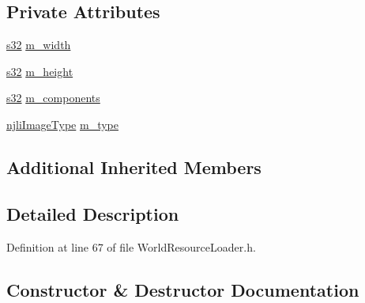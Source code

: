 \subsection*{Private Attributes}
\begin{DoxyCompactItemize}
\item 
\mbox{\hyperlink{_util_8h_aa62c75d314a0d1f37f79c4b73b2292e2}{s32}} \mbox{\hyperlink{structnjli_1_1_world_resource_loader_1_1_image_file_data_a815ccf3f42b60a7beead9461aab34639}{m\+\_\+width}}
\item 
\mbox{\hyperlink{_util_8h_aa62c75d314a0d1f37f79c4b73b2292e2}{s32}} \mbox{\hyperlink{structnjli_1_1_world_resource_loader_1_1_image_file_data_a1d7c73d35c27494186c9b111dcdc00f5}{m\+\_\+height}}
\item 
\mbox{\hyperlink{_util_8h_aa62c75d314a0d1f37f79c4b73b2292e2}{s32}} \mbox{\hyperlink{structnjli_1_1_world_resource_loader_1_1_image_file_data_afc583e7a8ffdb4522dad5ae4d96d486d}{m\+\_\+components}}
\item 
\mbox{\hyperlink{namespacenjli_a709a24b63b768ce1cdff54f7f48d3c0b}{njli\+Image\+Type}} \mbox{\hyperlink{structnjli_1_1_world_resource_loader_1_1_image_file_data_a50337476c93a38db97e503933b6b2b59}{m\+\_\+type}}
\end{DoxyCompactItemize}
\subsection*{Additional Inherited Members}


\subsection{Detailed Description}


Definition at line 67 of file World\+Resource\+Loader.\+h.



\subsection{Constructor \& Destructor Documentation}
\mbox{\label{structnjli_1_1_world_resource_loader_1_1_image_file_data_a95f67fd2dcd6fd0576e1c48f6bff3ede}} 

